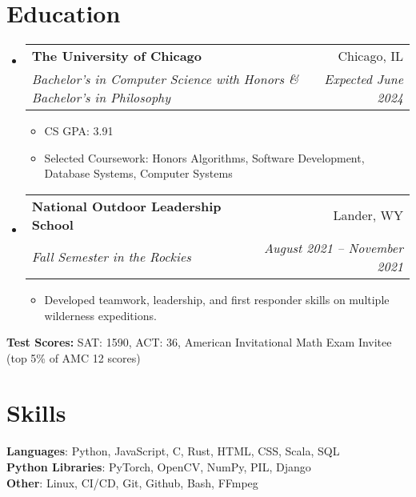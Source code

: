\documentclass[letterpaper,11pt]{article}
\makeatletter
\newcommand{\resumeItem}[1]{
  \item\small{
    {#1 \vspace{-2pt}}
  }
}
\newcommand{\resumeSubheading}[4]{
  \vspace{-2pt}\item
    \begin{tabular*}{0.97\textwidth}[t]{l@{\extracolsep{\fill}}r}
      \textbf{#1} & #2 \\
      \textit{\small#3} & \textit{\small #4} \\
    \end{tabular*}\vspace{-7pt}
}
\newcommand{\resumeSubHeadingListStart}{\begin{itemize}[leftmargin=0.125in, label={}]}
\newcommand{\resumeSubHeadingListEnd}{\end{itemize}}
\newcommand{\resumeItemListStart}{\begin{itemize}[leftmargin=0.185in]
}
\newcommand{\resumeItemListEnd}{\end{itemize}\vspace{-5pt}}
\makeatother
\begin{document}
\section{Education}
  \resumeSubHeadingListStart
    \resumeSubheading
      {The University of Chicago}{Chicago, IL}
      {Bachelor's in Computer Science with Honors \& Bachelor's in Philosophy}{Expected June 2024}
      \resumeItemListStart
        \resumeItem{CS GPA: 3.91}
        \resumeItem{{Selected Coursework:} 
        Honors Algorithms,
        Software Development,
        Database Systems,
        Computer Systems
        }
      \resumeItemListEnd

    \resumeSubheading
      {National Outdoor Leadership School}{Lander, WY}
      {Fall Semester in the Rockies}{August 2021 -- November 2021}
      \resumeItemListStart
        \resumeItem{Developed teamwork, leadership, and first responder skills on multiple wilderness expeditions.}
      \resumeItemListEnd
  \resumeSubHeadingListEnd
  {
    \vspace{-4pt}
    \noindent\hspace{0.15in}\small\textbf{Test Scores:} SAT: 1590, ACT: 36, American Invitational Math Exam Invitee (top 5\% of AMC 12 scores)
    \vspace{-5pt}
    }
\section{Skills}
  \begin{itemize}[leftmargin=0.15in, label={}]
    \small{\item{
      \textbf{Languages}{:
      Python,
      JavaScript,
      C,
      Rust,
      HTML,
      CSS,
      Scala,
      SQL} \\
      \textbf{Python Libraries}{: 
      PyTorch,
      OpenCV,
      NumPy,
      PIL,
      Django
      } 
      \\
      \textbf{Other}{:
        Linux,
        CI/CD,
        Git, 
        Github,
        Bash,
        FFmpeg
        }}}
      {\vspace{-5pt}}
  \end{itemize}
\end{document}
